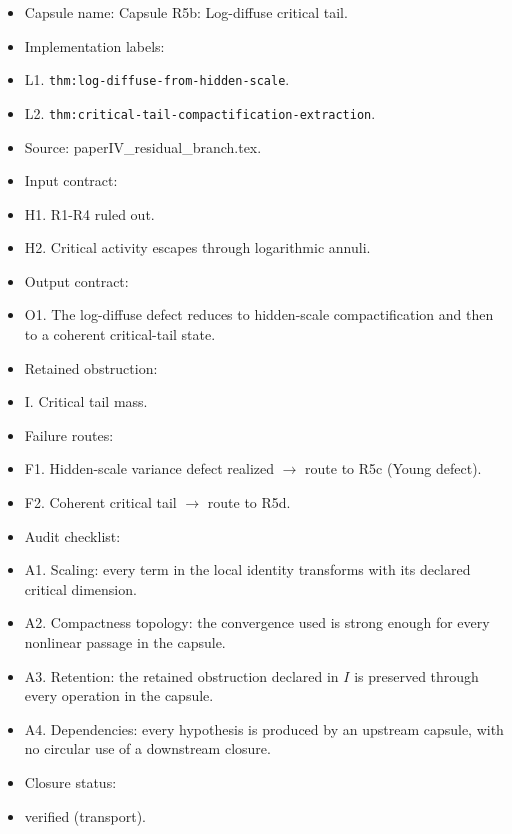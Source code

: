 \documentclass[11pt]{amsart}
\begin{document}
\begin{itemize}
  \item Capsule name: Capsule R5b: Log-diffuse critical tail.
  \item Implementation labels:
  \item L1. \texttt{thm:log-diffuse-from-hidden-scale}.
  \item L2. \texttt{thm:critical-tail-compactification-extraction}.
  \item Source: paperIV\_residual\_branch.tex.
  \item Input contract:
  \item H1. R1-R4 ruled out.
  \item H2. Critical activity escapes through logarithmic annuli.
  \item Output contract:
  \item O1. The log-diffuse defect reduces to hidden-scale compactification and then to a coherent critical-tail state.
  \item Retained obstruction:
  \item I. Critical tail mass.
  \item Failure routes:
  \item F1. Hidden-scale variance defect realized $\to$ route to R5c (Young defect).
  \item F2. Coherent critical tail $\to$ route to R5d.
  \item Audit checklist:
  \item A1. Scaling: every term in the local identity transforms with its declared critical dimension.
  \item A2. Compactness topology: the convergence used is strong enough for every nonlinear passage in the capsule.
  \item A3. Retention: the retained obstruction declared in $I$ is preserved through every operation in the capsule.
  \item A4. Dependencies: every hypothesis is produced by an upstream capsule, with no circular use of a downstream closure.
  \item Closure status:
  \item verified (transport).
\end{itemize}
\end{document}
